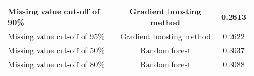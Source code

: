 \documentclass{article}\usepackage[]{graphicx}\usepackage[]{color}
\begin{document}
\begin{table}[ht]
\begin{tabular}{@{}|l|c|c|@{}}
                                                                                                                                                                                                                                                                                                                                                                                                                                                                                                                                                                                                \textbf{Missing value cut-off of 90\%} & \textbf{Gradient boosting method} & \textbf{0.2613} \\
                                                                                                                                                                                                                                                                                                                                                                                                                                                                                                                                                                                                Missing value cut-off of 95\% & Gradient boosting method & 0.2622 \\
                                                                                                                                                                                                                                                                                                                                                                                                                                                                                                                                                                                                Missing value cut-off of 50\% & Random forest & 0.3037 \\ 
                                                                                                                                                                                                                                                                                                                                                                                                                                                                                                                                                                                                Missing value cut-off of 80\% & Random forest & 0.3088 \\


\end{tabular}
\end{table}
\end{document}
